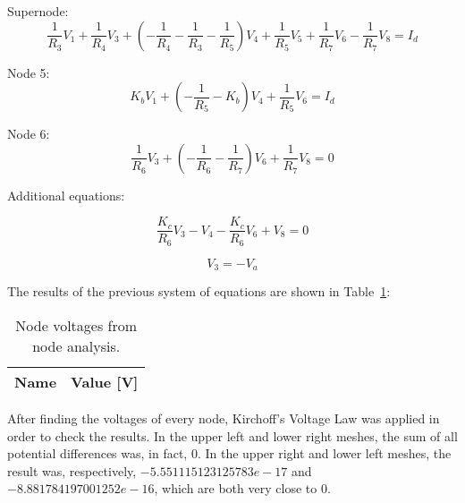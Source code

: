 Supernode:
\begin{equation}
  \frac{1}{R_3}V_1 + \frac{1}{R_4}V_3 + (-\frac{1}{R_4}-\frac{1}{R_3}-\frac{1}{R_5})V_4 + \frac{1}{R_5}V_5 + \frac{1}{R_7}V_6 - \frac{1}{R_7}V_8 = I_d
  \label{eq:node4}
\end{equation}

Node 5:
\begin{equation}
  K_bV_1 + (-\frac{1}{R_5}-K_b)V_4 + \frac{1}{R_5}V_6 = I_d
  \label{eq:node5}
\end{equation}

Node 6:
\begin{equation}
  \frac{1}{R_6}V_3 + (-\frac{1}{R_6}-\frac{1}{R_7})V_6 + \frac{1}{R_7}V_8 = 0
  \label{eq:node6}
\end{equation}

\vspace{4mm}
Additional equations: \vspace{2mm}

\begin{equation}
  \frac{K_c}{R_6}V_3 - V_4 -\frac{K_c}{R_6}V_6 + V_8 = 0
  \label{eq:node8}
\end{equation}

\begin{equation}
  V_3 = -V_a
  \label{eq:node3}
\end{equation}

The results of the previous system of equations are shown in Table~\ref{tab:nodeV}:
 
\begin{table}[h]
  \centering
  \begin{tabular}{|l|r|}
    \hline    
    {\bf Name} & {\bf Value [V]} \\ \hline
    
  \end{tabular}
  \caption{Node voltages from node analysis.}
  \label{tab:nodeV}
\end{table}

After finding the voltages of every node, Kirchoff's Voltage Law was applied in order to check the results. 
In the upper left and lower right meshes, the sum of all potential differences was, in fact, 0. 
In the upper right and lower left meshes, the result was, respectively, $-5.551115123125783e-17$ and $-8.881784197001252e-16$, which are both very close to 0.





